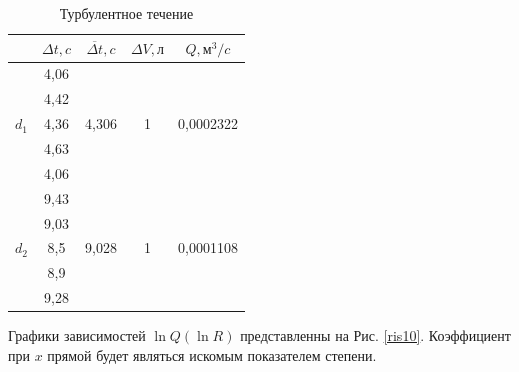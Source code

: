 \documentclass[a4paper, 12pt]{article}
\begin{document}
\begin{table}[h!]
\begin{center}
\begin{tabular}{|c|c|c|c|c|}
\hline
 & $\Delta{t}, c$ & $\overline{\Delta{t}}, c$ & $\Delta{V}, л$  & $Q, м^3/c$ \\ \hline
\multirow{5}{*}{$d_1$} & 4,06  & \multirow{5}{*}{4,306}         & \multirow{5}{*}{1} & \multirow{5}{*}{0,0002322} \\ \cline{2-2}
                    & 4,42  &                                &                    &                            \\ \cline{2-2}
                    & 4,36  &                                &                    &                            \\ \cline{2-2}
                    & 4,63  &                                &                    &                            \\ \cline{2-2}
                    & 4,06  &                                &                    &                            \\ \hline
\multirow{5}{*}{$d_2$} & 9,43  & \multirow{5}{*}{9,028}         & \multirow{5}{*}{1} & \multirow{5}{*}{0,0001108} \\ \cline{2-2}
                    & 9,03  &                                &                    &                            \\ \cline{2-2}
                    & 8,5   &                                &                    &                            \\ \cline{2-2}
                    & 8,9   &                                &                    &                            \\ \cline{2-2}
                    & 9,28  &                                &                    &                            \\ \hline
\end{tabular}
\caption{Турбулентное течение}
\label{tab8}
\end{center}
\end{table}
\par Графики зависимостей $\ln{Q}(\ln{R})$ представленны на Рис. \ref{ris10}. Коэффициент при $x$ прямой будет являться искомым показателем степени.
\end{document}
